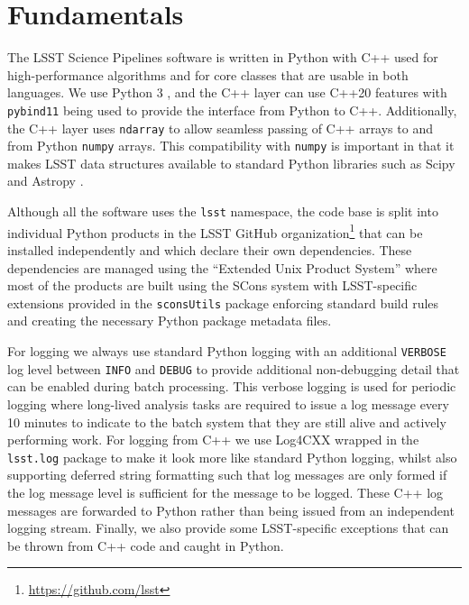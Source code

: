 \section{Fundamentals}
\label{sec:support}

The LSST Science Pipelines software is written in Python with C++ used for high-performance algorithms and for core classes that are usable in both languages.
We use Python 3 \citep[having ported from python 2,][currently with a minimum version of Python 3.12]{2020ASPC..522..541J}, and the C++ layer can use C++20 features with \texttt{pybind11} being used to provide the interface from Python to C++.
Additionally, the C++ layer uses \texttt{ndarray} to allow seamless passing of C++ arrays to and from Python \texttt{numpy} arrays.
This compatibility with \texttt{numpy} is important in that it makes LSST data structures available to standard Python libraries such as Scipy and Astropy \citep{2016SPIE.9913E..0GJ,2018AJ....156..123A}.

Although all the software uses the \texttt{lsst} namespace, the code base is split into individual Python products in the LSST GitHub organization\footnote{\url{https://github.com/lsst}} that can be installed independently and which declare their own dependencies.
These dependencies are managed using the ``Extended Unix Product System'' \citep[EUPS;][]{EUPS,2018SPIE10707E..09J} where
most of the products are built using the SCons system \citep{2005Scons1377085} with LSST-specific extensions provided in the \texttt{sconsUtils} package enforcing standard build rules and creating the necessary Python package metadata files.

For logging we always use standard Python logging with an additional \texttt{VERBOSE} log level between \texttt{INFO} and \texttt{DEBUG} to provide additional non-debugging detail that can be enabled during batch processing.
This verbose logging is used for periodic logging where long-lived analysis tasks are required to issue a log message every 10 minutes to indicate to the batch system that they are still alive and actively performing work.
For logging from C++ we use Log4CXX wrapped in the \texttt{lsst.log} package to make it look more like standard Python logging, whilst also supporting deferred string formatting such that log messages are only formed if the log message level is sufficient for the message to be logged.
These C++ log messages are forwarded to Python rather than being issued from an independent logging stream.
Finally, we also provide some LSST-specific exceptions that can be thrown from C++ code and caught in Python.

